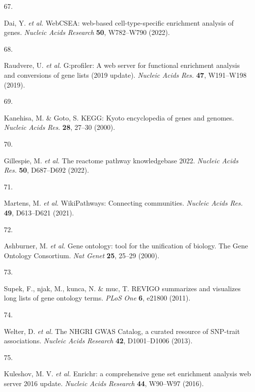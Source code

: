 \documentclass[
  11,
  a4paper,
]{article}
\newlength{\cslhangindent}
\newlength{\csllabelwidth}
\newlength{\cslentryspacingunit} %
\newenvironment{CSLReferences}[2] %
 {%
  \setlength{\parindent}{0pt}
  \ifodd #1
  \let\oldpar\par
  \def\par{\hangindent=\cslhangindent\oldpar}
  \fi
  \setlength{\parskip}{#2\cslentryspacingunit}
 }%
 {}
\newcommand{\CSLLeftMargin}[1]{\parbox[t]{\csllabelwidth}{#1}}
\newcommand{\CSLRightInline}[1]{\parbox[t]{\linewidth - \csllabelwidth}{#1}\break}
\begin{document}
\begin{CSLReferences}{0}{0}
\leavevmode{}%
\CSLLeftMargin{67. }%
\CSLRightInline{Dai, Y. \emph{et al.} {WebCSEA: web-based
cell-type-specific enrichment analysis of genes}. \emph{Nucleic Acids
Research} \textbf{50}, W782--W790 (2022).}

\leavevmode{}%
\CSLLeftMargin{68. }%
\CSLRightInline{Raudvere, U. \emph{et al.} G:profiler: A web server for
functional enrichment analysis and conversions of gene lists (2019
update). \emph{Nucleic Acids Res.} \textbf{47}, W191--W198 (2019).}

\leavevmode{}%
\CSLLeftMargin{69. }%
\CSLRightInline{Kanehisa, M. \& Goto, S. {KEGG}: Kyoto encyclopedia of
genes and genomes. \emph{Nucleic Acids Res.} \textbf{28}, 27--30
(2000).}

\leavevmode{}%
\CSLLeftMargin{70. }%
\CSLRightInline{Gillespie, M. \emph{et al.} The reactome pathway
knowledgebase 2022. \emph{Nucleic Acids Res.} \textbf{50}, D687--D692
(2022).}

\leavevmode{}%
\CSLLeftMargin{71. }%
\CSLRightInline{Martens, M. \emph{et al.} {WikiPathways}: Connecting
communities. \emph{Nucleic Acids Res.} \textbf{49}, D613--D621 (2021).}

\leavevmode{}%
\CSLLeftMargin{72. }%
\CSLRightInline{Ashburner, M. \emph{et al.} {{G}ene ontology: tool for
the unification of biology. {T}he {G}ene {O}ntology {C}onsortium}.
\emph{Nat Genet} \textbf{25}, 25--29 (2000).}

\leavevmode{}%
\CSLLeftMargin{73. }%
\CSLRightInline{Supek, F., njak, M., kunca, N. \& muc, T.
{{R}{E}{V}{I}{G}{O} summarizes and visualizes long lists of gene
ontology terms}. \emph{PLoS One} \textbf{6}, e21800 (2011).}

\leavevmode{}%
\CSLLeftMargin{74. }%
\CSLRightInline{Welter, D. \emph{et al.} {The NHGRI GWAS Catalog, a
curated resource of SNP-trait associations}. \emph{Nucleic Acids
Research} \textbf{42}, D1001--D1006 (2013).}

\leavevmode{}%
\CSLLeftMargin{75. }%
\CSLRightInline{Kuleshov, M. V. \emph{et al.} {Enrichr: a comprehensive
gene set enrichment analysis web server 2016 update}. \emph{Nucleic
Acids Research} \textbf{44}, W90--W97 (2016).}


\end{CSLReferences}
\end{document}
